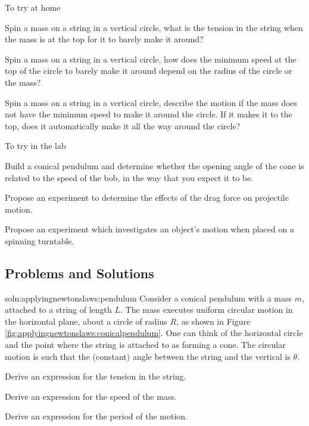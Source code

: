 \begin{chapteractivity}{To try at home}
{
\item Spin a mass on a string in a vertical circle, what is the tension in the string when the mass is at the top for it to barely make it around?
\item Spin a mass on a string in a vertical circle, how does the minimum speed at the top of the circle to barely make it around  depend on the radius of the circle or the mass?
\item Spin a mass on a string in a vertical circle, describe the motion if the mass does not have the minimum speed to make it around the circle. If it makes it to the top, does it automatically make it all the way around the circle?
}
\end{chapteractivity}

\begin{chapteractivity}{To try in the lab}
{
\item Build a conical pendulum and determine whether the opening angle of the cone is related to the speed of the bob, in the way that you expect it to be.
\item Propose an experiment to determine the effects of the drag force on projectile motion.
\item Propose an experiment which investigates an object's motion when placed on a spinning turntable.
}
\end{chapteractivity}

\newpage
\subsection{Problems and Solutions}

\begin{problemParts}{soln:applyingnewtonslaws:pendulum}{\label{prob:applyingnewtonslaws:pendulum} Consider a conical pendulum with a mass $m$, attached to a string of length $L$. The mass executes uniform circular motion in the horizontal plane, about a circle of radius $R$, as shown in Figure \ref{fig:applyingnewtonslaws:conicalpendulum}. One can think of the horizontal circle and the point where the string is attached to as forming a cone. The circular motion is such that the (constant) angle between the string and the vertical is $\theta$.}{
\item Derive an expression for the tension in the string.
\item Derive an expression for the speed of the mass.
\item Derive an expression for the period of the motion.
}
\end{problemParts}

